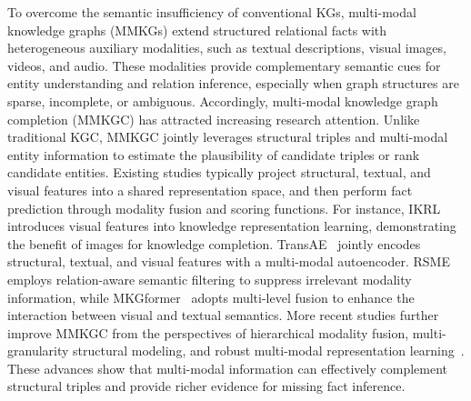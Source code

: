 \documentclass[pdflatex,sn-mathphys-num]{sn-jnl}
\begin{document}
To overcome the semantic insufficiency of conventional KGs, multi-modal knowledge graphs (MMKGs) extend structured relational facts with heterogeneous auxiliary modalities, such as textual descriptions, visual images, videos, and audio. These modalities provide complementary semantic cues for entity understanding and relation inference, especially when graph structures are sparse, incomplete, or ambiguous. Accordingly, multi-modal knowledge graph completion (MMKGC) has attracted increasing research attention. Unlike traditional KGC, MMKGC jointly leverages structural triples and multi-modal entity information to estimate the plausibility of candidate triples or rank candidate entities. Existing studies typically project structural, textual, and visual features into a shared representation space, and then perform fact prediction through modality fusion and scoring functions. For instance, IKRL~\cite{xie2017ikrl} introduces visual features into knowledge representation learning, demonstrating the benefit of images for knowledge completion. TransAE~\cite{wang2019transae} jointly encodes structural, textual, and visual features with a multi-modal autoencoder. RSME~\cite{wang2021rsme} employs relation-aware semantic filtering to suppress irrelevant modality information, while MKGformer~\cite{chen2022mkgformer} adopts multi-level fusion to enhance the interaction between visual and textual semantics. More recent studies further improve MMKGC from the perspectives of hierarchical modality fusion, multi-granularity structural modeling, and robust multi-modal representation learning~\cite{wang2026hfr,li2026safer,liu2026mhyper}. These advances show that multi-modal information can effectively complement structural triples and provide richer evidence for missing fact inference.
\end{document}
